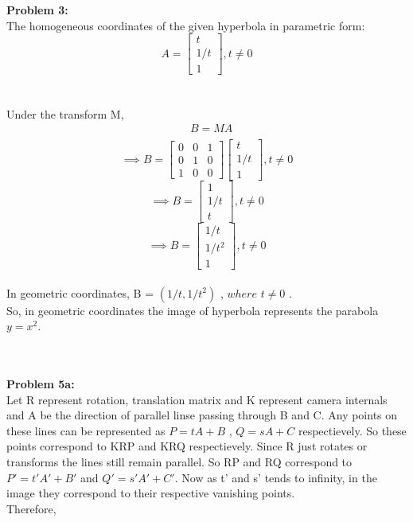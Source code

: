 \documentclass[a4paper]{article}
\begin{document}
\maketitle
\hrulefill
\\ \\
\textbf{Problem 3:} \\
The homogeneous coordinates of the given hyperbola in parametric form:
\[
A = 
\begin{bmatrix}
t \\
1/t \\
1
\end{bmatrix}
, t \neq 0 \]
\\  \\
Under the transform M,
\begin{equation*}
\begin{split}
& B = MA \\
\end{split}
\end{equation*}
\[
\implies
B =
\begin{bmatrix}
    0 & 0 & 1  \\
    0 & 1 & 0  \\
    1 & 0 & 0
    \end{bmatrix}
    \begin{bmatrix}
    t \\
    1/t \\
    1
    \end{bmatrix}
    , t \neq 0 
\]
\[
\implies
B = 
\begin{bmatrix}
1 \\ 
1/t \\
t
\end{bmatrix}
, t \neq 0
\]
\[
\implies
B = 
\begin{bmatrix}
1/t \\ 
1/t^2 \\
1
\end{bmatrix}
, t \neq 0
\]
\\
In geometric coordinates, B = $ (1/t, 1/t^2)$ , $ where $ $ t \neq 0 $ . \\
So, in geometric coordinates the image of hyperbola represents the parabola $ y = x^2. $  

\hrulefill\\ \\
\textbf{Problem 5a:} \\
Let R represent rotation, translation matrix and K represent camera internals and A be the direction of parallel linse passing through B and C. Any points on these lines can be represented as $P=tA+B$ , $Q=sA+C$ respectievely. So these points correspond to KRP and KRQ respectievely. Since R just rotates or transforms the lines still remain parallel. So RP and RQ correspond to $P' = t'A'+B'$ and $Q'=s'A'+C'$. Now as t' and s' tends to infinity, in the image they correspond to their respective vanishing points.\\
Therefore, 
\end{document}
